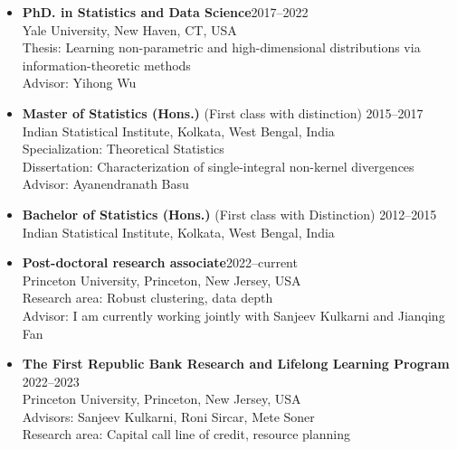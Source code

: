 \documentclass[letterpaper,11pt,oneside]{article}
\theoremstyle{definition}
\begin{document}
	\begin{itemize}
		\item[] {\bf PhD. in Statistics and Data Science}\hfill 2017--2022\\
		Yale University, New Haven, CT, USA\\
		Thesis: Learning non-parametric and high-dimensional distributions via information-theoretic
		methods \\
		Advisor: Yihong Wu  
		
		\item[] {\bf 	Master of Statistics (Hons.)} (First class with distinction) \hfill 2015--2017\\
		Indian Statistical Institute, Kolkata, West Bengal, India\\
		Specialization: Theoretical Statistics\\
		Dissertation: Characterization of single-integral non-kernel divergences \\
		Advisor: Ayanendranath Basu
		
		\item[] 
		{\bf Bachelor of Statistics (Hons.)} (First class with Distinction) \hfill 2012--2015 \\
		{Indian Statistical Institute, Kolkata, West Bengal, India}  
	\end{itemize}
	
	
	\begin{itemize}
		\item[] {\bf Post-doctoral research associate}\hfill 2022--current\\
		 Princeton University, Princeton, New Jersey, USA\\
		Research area: Robust clustering, data depth\\
		Advisor: I am currently working jointly with Sanjeev Kulkarni and Jianqing Fan  
		
		\item[] {\bf The First Republic Bank Research and Lifelong Learning Program} \hfill 2022--2023\\
		Princeton University, Princeton, New Jersey, USA\\
		Advisors: Sanjeev Kulkarni, Roni Sircar, Mete Soner\\
		Research area: Capital call line of credit, resource planning
		
	\end{itemize}
\end{document}
